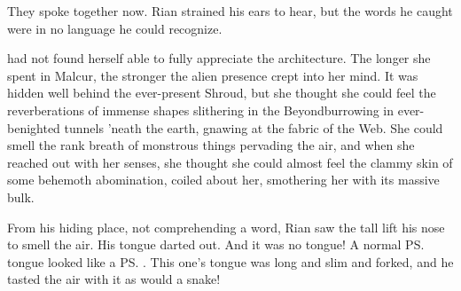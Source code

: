 They spoke together now. 
Rian strained his ears to hear, but the words he caught were in no language he could recognize. 










\begin{comment}
\subsection{Black magic}
\end{comment}

\begin{comment}
\subsubsection{\Criseis}
\end{comment}
\new
{}


\Criseis{} had not found herself able to fully appreciate the architecture. The longer she spent in Malcur, the stronger the alien presence crept into her mind. 
It was hidden well behind the ever-present Shroud, but she thought she could feel the reverberations of immense shapes slithering in the Beyond\dash burrowing in ever-benighted tunnels 'neath the earth, gnawing at the fabric of the Web. She could smell the rank breath of monstrous things pervading the air, and when she reached out with her senses, she thought she could almost feel the clammy skin of some behemoth abomination, coiled about her, smothering her with its massive bulk. 







\begin{comment}
\subsubsection{Rian}
\end{comment}
\new
From his hiding place, not comprehending a word, Rian saw the tall \dax{} lift his nose to smell the air. 
His tongue darted out. 
And it was no \scathaese{} tongue! 
A normal \ps{\scatha} tongue looked like a \ps{\human}. 
This one's tongue was long and slim and forked, and he tasted the air with it as would a snake!

